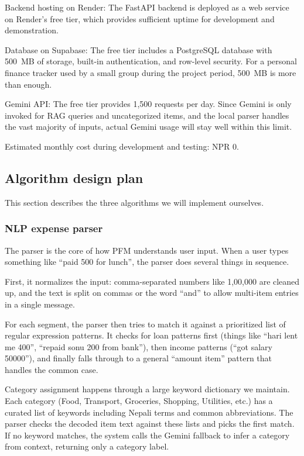 \documentclass[12pt, a4paper]{article}
\begin{document}
Backend hosting on Render: The FastAPI backend is deployed as a web service on Render's free tier, which provides sufficient uptime for development and demonstration.

Database on Supabase: The free tier includes a PostgreSQL database with 500~MB of storage, built-in authentication, and row-level security. For a personal finance tracker used by a small group during the project period, 500~MB is more than enough.

Gemini API: The free tier provides 1,500 requests per day. Since Gemini is only invoked for RAG queries and uncategorized items, and the local parser handles the vast majority of inputs, actual Gemini usage will stay well within this limit.

Estimated monthly cost during development and testing: NPR 0.

\subsection{Algorithm design plan}

This section describes the three algorithms we will implement ourselves.

\subsubsection{NLP expense parser}

The parser is the core of how PFM understands user input. When a user types something like ``paid 500 for lunch'', the parser does several things in sequence.

First, it normalizes the input: comma-separated numbers like 1,00,000 are cleaned up, and the text is split on commas or the word ``and'' to allow multi-item entries in a single message.

For each segment, the parser then tries to match it against a prioritized list of regular expression patterns. It checks for loan patterns first (things like ``hari lent me 400'', ``repaid sonu 200 from bank''), then income patterns (``got salary 50000''), and finally falls through to a general ``amount item'' pattern that handles the common case.

Category assignment happens through a large keyword dictionary we maintain. Each category (Food, Transport, Groceries, Shopping, Utilities, etc.) has a curated list of keywords including Nepali terms and common abbreviations. The parser checks the decoded item text against these lists and picks the first match. If no keyword matches, the system calls the Gemini fallback to infer a category from context, returning only a category label.
\end{document}
